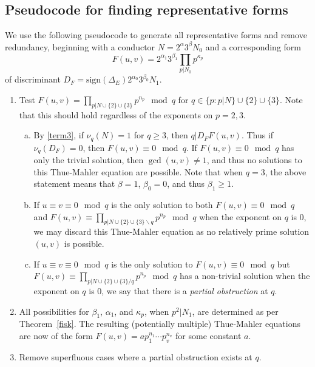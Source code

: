 \documentclass[11pt]{report}
\theoremstyle{definition}
\begin{document}

\subsection{Pseudocode for finding representative forms}
\label{sec:pseud-find-repr}

We use the following pseudocode to generate all representative forms and remove redundancy, beginning with a conductor $N = 2^{\alpha}3^{\beta}N_0$ and a corresponding form
\[F(u,v) = 2^{\alpha_1}3^{\beta_1}\prod_{p|N_0}p^{\kappa_p}\]
of discriminant $D_F = \text{sign}(\Delta_E)2^{\alpha_0}3^{\beta_0}N_1$.

\begin{enumerate}[1.]
\item Test $F(u,v) = \prod_{p|N \cup \{2\} \cup \{3\}}p^{n_p} \mod{q}$ for $q \in \{p : p|N\} \cup \{2\} \cup \{3\}$. Note that this should hold regardless of the exponents on $p = 2,3$.
  \begin{enumerate}[a.]
  \item By \eqref{term3}, if $\nu_q(N) = 1$ for $q \geq 3$, then $q|D_FF(u,v)$. Thus if $\nu_q(D_F) = 0$, then $F(u,v) \equiv 0 \mod q$. If $F(u,v) \equiv 0 \mod q$ has only the trivial solution, then $\gcd(u,v) \neq 1$, and thus no solutions to this Thue-Mahler equation are possible. Note that when $q = 3$, the above statement means that $\beta = 1$, $\beta_0 = 0$, and thus $\beta_1 \geq 1$.
  \item If $u \equiv v \equiv 0 \mod q$ is the only solution to both $F(u,v) \equiv 0 \mod q$ and $F(u,v) \equiv \prod_{p|N \cup \{2\} \cup \{3\}\backslash q}p^{n_p} \mod{q}$ when the exponent on $q$ is 0, we may discard this Thue-Mahler equation as no relatively prime solution $(u,v)$ is possible.
  \item If $u \equiv v \equiv 0 \mod q$ is the only solution to $F(u,v) \equiv 0 \mod q$ but $F(u,v) \equiv \prod_{p|N \cup \{2\} \cup \{3\}/q}p^{n_p} \mod{q}$ has a non-trivial solution when the exponent on $q$ is 0, we say that there is a \textit{partial obstruction} at $q$.
  \end{enumerate}
\item All possibilities for $\beta_1$, $\alpha_1$, and $\kappa_p$, when $p^2 | N_1$, are determined as per Theorem~\ref{fisk}. The resulting (potentially multiple) Thue-Mahler equations are now of the form $F(u,v) = ap_1^{n_1}\cdots p_v^{n_v}$ for some constant $a$.
\item Remove superfluous cases where a partial obstruction exists at $q$.

\end{enumerate}
\end{document}
